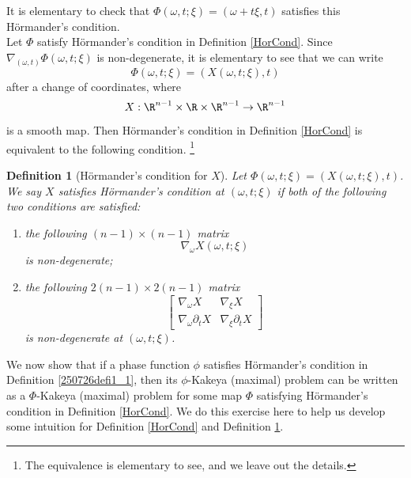 \documentclass{article}
\numberwithin{equation}{section}
\theoremstyle{plain}
\newtheorem{definition}[theorem]{Definition}
\begin{document}
	
	
	 It is elementary to check that  $\Phi(\omega, t; \xi)= (\omega+t\xi, t)$ satisfies this H\"ormander's condition. \\
	 
	 
	 
Let $\Phi$ satisfy H\"ormander's condition in Definition \ref{HorCond}. Since $\nabla_{(\omega, t)} \Phi(\omega, t; \xi)$ is non-degenerate, it is elementary to see that we can write 
	\begin{equation}\label{250727e1_25}
		\Phi(\omega, t; \xi)=\left(X(\omega, t; \xi),t\right)
	\end{equation}
	after a change of coordinates, where 
	\begin{equation}
	X: \R^{n-1}\times\R\times\R^{n-1}\rightarrow\R^{n-1}
	\end{equation}
	 is a smooth map. Then H\"ormander's condition in Definition \ref{HorCond} is equivalent to the following condition. \footnote{The equivalence is elementary to see, and we leave out the details. }
	 
	 
	 	
	\begin{definition}[H\"ormander's condition for $X$]\label{HorCondX}
		Let $\Phi(\omega, t; \xi)=\left(X(\omega, t; \xi), t\right)$. We say $X$ satisfies H\"ormander's condition at $(\omega, t; \xi)$ if both of the following two conditions are satisfied:
		\begin{enumerate}
			\item[(1)] the following $(n-1)\times (n-1)$ matrix
			\begin{equation}\label{le1.11}
				\nabla_{\omega} X(\omega, t; \xi) 
			\end{equation}
			is non-degenerate; 
			\item[(2)] the following $2(n-1)\times 2(n-1)$ matrix 
			\begin{equation}\label{le1.12}
				\begin{bmatrix}
					\nabla_\omega X & \nabla_{\xi}X\\
					\nabla_\omega\partial_t X & \nabla_{\xi}\partial_t X
				\end{bmatrix}
			\end{equation}
			is non-degenerate at $(\omega, t; \xi)$.
		\end{enumerate}
	\end{definition}
	
	
	
	
	
	 We now show that if a phase function $\phi$ satisfies H\"ormander's condition in Definition \ref{250726defi1_1}, then its $\phi$-Kakeya (maximal) problem can be written as a $\Phi$-Kakeya (maximal) problem for some map $\Phi$ satisfying H\"ormander's condition in Definition \ref{HorCond}. We do this exercise here to help us develop some intuition for Definition \ref{HorCond} and Definition \ref{HorCondX}. 
	 
\end{document}

